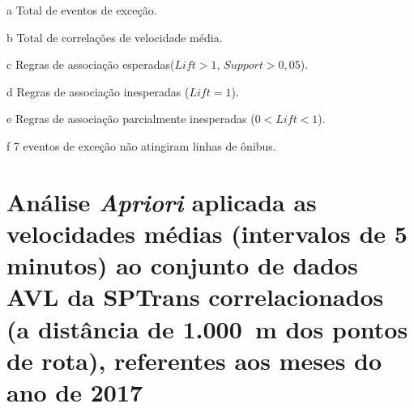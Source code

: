 \documentclass[
	12pt,				%
	oneside,			%
	a4paper,			%
	english,			%
	brazil				%
	]{abntex2ppgsi}
\begin{document}
{{{\begin{apendicesenv}
\begin{table}[!htb]
\begin{threeparttable}
\begin{tablenotes}
            \item[a] Total de eventos de exceção.
            \item[b] Total de correlações de velocidade média.
            \item[c] Regras de associação esperadas($Lift > 1$, $Support > 0,05$).
            \item[d] Regras de associação inesperadas ($Lift = 1$).
            \item[e] Regras de associação parcialmente inesperadas ($0 < Lift < 1$).
            \item[f] 7 eventos de exceção não atingiram linhas de ônibus.
        \end{tablenotes}
\end{threeparttable}
\end{table}

\clearpage

\section{Análise \textit{Apriori} aplicada as velocidades médias (intervalos de 5 minutos) ao conjunto de dados AVL da SPTrans correlacionados (a distância de 1.000~m dos pontos de rota), referentes aos meses do ano de 2017}
\label{g4}



\end{apendicesenv}}}}
\end{document}
